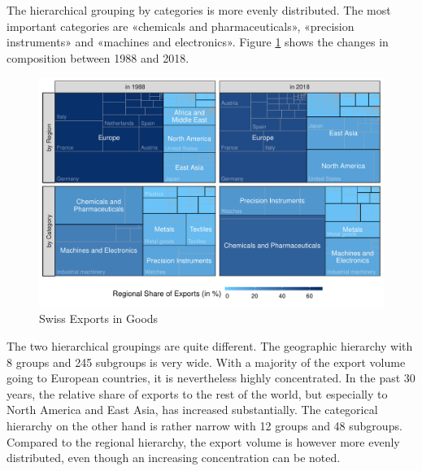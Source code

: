 \documentclass[a4paper,fleqn,11pt]{article}
\begin{document}
The hierarchical grouping by categories is more evenly distributed. The most important categories are «chemicals and pharmaceuticals», «precision instruments» and «machines and electronics». Figure \ref{fig:treemap} shows the changes in composition between 1988 and 2018.
\begin{figure}[H]
	\includegraphics[width=\textwidth]{fig/fig_treemap}
	\caption{Swiss Exports in Goods}\label{fig:treemap}
\end{figure}
The two hierarchical groupings are quite different. The geographic hierarchy with 8 groups and 245 subgroups is very wide.  With a majority of the export volume going to European countries, it is nevertheless highly concentrated. In the past 30 years, the relative share of exports to the rest of the world, but especially to North America and East Asia, has increased substantially. The categorical hierarchy on the other hand is rather narrow with 12 groups and 48 subgroups. Compared to the regional hierarchy, the export volume is however more evenly distributed, even though an increasing concentration can be noted.\\
\end{document}
